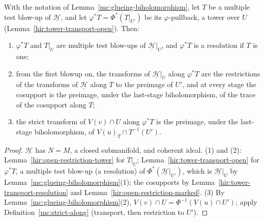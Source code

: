 \begin{theorem}
\label{mc:glueing-tower-pullback}
\leanok
With the notation of Lemma~\ref{mc:glueing-biholomorphism}, let \(T\) be a multiple test blow-up of \(\underline{\mathcal H}\), and let
\(\varphi^*T=\Phi^*(T|_{U'})\) be its \(\varphi\)-pullback, a tower over \(U\) (Lemma~\ref{hir:tower-transport-open}). Then:
\begin{enumerate}
\item \(\varphi^*T\) and \(T|_U\) are multiple test blow-ups of \(\underline{\mathcal H}|_U\), and \(\varphi^*T\) is a resolution if \(T\) is one;
\item from the first blowup on, the transforms of \(\underline{\mathcal H}|_U\) along \(\varphi^*T\) are the restrictions of the transforms of
\(\underline{\mathcal H}\) along \(T\) to the preimage of \(U'\), and at every stage the cosupport is the preimage, under the last-stage biholomorphism, of the
trace of the cosupport along \(T\);
\item the strict transform of \(V(v)\cap U\) along \(\varphi^*T\) is the preimage, under the last-stage biholomorphism, of
\(V(u)_T\cap T^{-1}(U')\).
\end{enumerate}
\end{theorem}
\begin{proof}
\leanok
\(\underline{\mathcal H}\) has \(N=M\), a closed submanifold, and coherent ideal. (1) and (2): Lemma~\ref{hir:open-restriction-tower} for \(T|_U\);
Lemma~\ref{hir:tower-transport-open} for \(\varphi^*T\), a multiple test blow-up (a resolution) of \(\Phi^*(\underline{\mathcal H}|_{U'})\), which is
\(\underline{\mathcal H}|_U\) by Lemma~\ref{mc:glueing-biholomorphism}(1); the cosupports by Lemma~\ref{hir:tower-transport-resolution} and
Lemma~\ref{hir:open-restriction-marked}. (3) By Lemma~\ref{mc:glueing-biholomorphism}(2), \(V(v)\cap U=\Phi^{-1}(V(u)\cap U')\); apply
Definition~\ref{mc:strict-along} (transport, then restriction to \(U'\)).
\end{proof}
